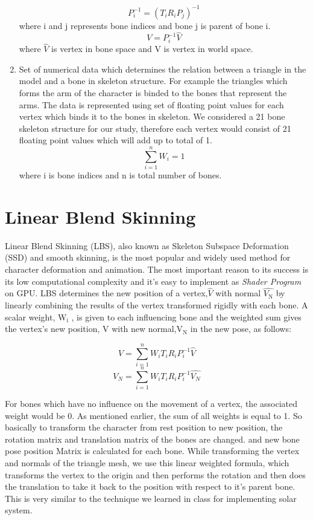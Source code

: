 \documentclass[annual]{styles/acmsiggraph}
\begin{document}
\begin{enumerate}
\[P_{i}^{-1} = (T_{i}R_{i}P_{j})^{-1}\]where i and j represents bone indices and bone j is parent of bone i.
\[V=P_{i}^{-1}\widehat{V}\] where $\widehat{V}$ is vertex in bone space and V is vertex in world space.

\item Set of numerical data which determines the relation between a triangle in the model and a bone in skeleton structure. For example the triangles which forms the arm of the character is binded to the bones that represent the arms. The data is represented using set of floating point values for each vertex which binds it to the bones in skeleton. We considered a 21 bone skeleton structure for our study, therefore each vertex would consist of 21 floating point values which will add up to total of 1.
\[\sum_{i=1}^{n} W_{i}=1\] where i is bone indices and n is total number of bones.
\end{enumerate}

\section{Linear Blend Skinning}
Linear Blend Skinning (LBS), also known as Skeleton Subspace Deformation (SSD) and smooth skinning, is the most popular and widely used method for character deformation and animation. The most important reason to its success is its low computational complexity and it’s easy to implement as \textit{Shader Program} on GPU. LBS determines the new position of a vertex,$\widehat{V}$ with normal $\widehat{V_{\text{N}}}$  by linearly combining the results of the vertex transformed rigidly with each bone. A scalar weight, W$_{\text{i}}$ , is given to each inﬂuencing bone and the weighted sum gives the vertex’s new position, V with new normal,V$_\text{N}$ in the new pose, as follows:

\[V= \sum_{i=1}^{n}W_{i}T_{i}R_{i}P_{i}^{-1}\widehat{V}\]
\[V_{N}= \sum_{i=1}^{n}W_{i}T_{i}R_{i}P_{i}^{-1}\widehat{V_{N}}\]

For bones which have no inﬂuence on the movement of a vertex, the associated weight would be 0. As mentioned earlier, the sum of all weights is equal to 1.  So basically to transform the character from rest position to new position, the rotation matrix and translation matrix of the bones are changed. and new bone pose position Matrix is calculated for each bone. While transforming the vertex and normals of the triangle mesh, we use this linear weighted formula, which transforms the vertex to the origin and then performs the rotation and then does the translation to take it back to the position with respect to it’s parent bone. This is very similar to the technique we learned in class for implementing solar system.
\end{document}
